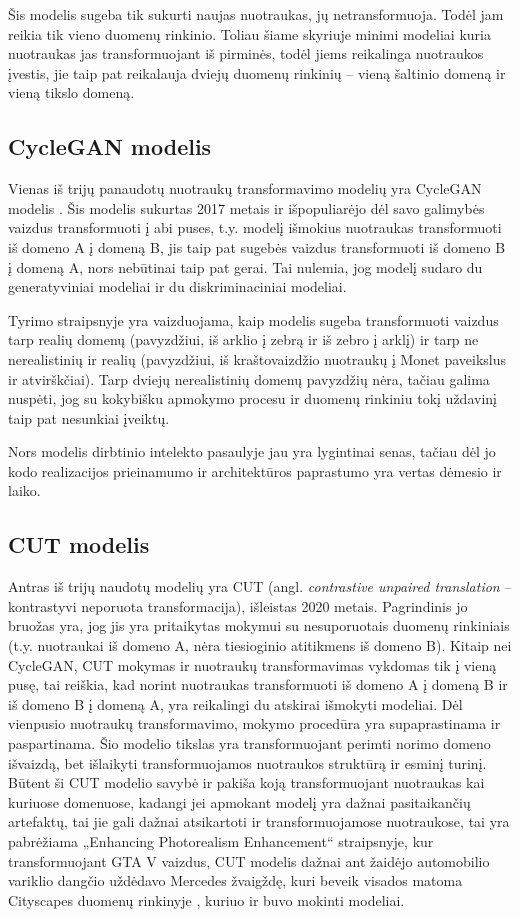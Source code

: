 \documentclass{VUMIFPSkursinis}
\begin{document}
        Šis modelis sugeba tik sukurti naujas nuotraukas, jų netransformuoja. Todėl jam reikia tik vieno duomenų rinkinio. Toliau šiame skyriuje minimi modeliai kuria nuotraukas jas transformuojant iš pirminės, todėl jiems reikalinga nuotraukos įvestis, jie taip pat reikalauja dviejų duomenų rinkinių – vieną šaltinio domeną ir vieną tikslo domeną.
    \subsection{CycleGAN modelis}
        Vienas iš trijų panaudotų nuotraukų transformavimo modelių yra CycleGAN modelis \cite{CycleGAN2017}. Šis modelis sukurtas 2017 metais ir išpopuliarėjo dėl savo galimybės vaizdus transformuoti į abi puses, t.y. modelį išmokius nuotraukas transformuoti iš domeno A į domeną B, jis taip pat sugebės vaizdus transformuoti iš domeno B į domeną A, nors nebūtinai taip pat gerai. Tai nulemia, jog modelį sudaro du generatyviniai modeliai ir du diskriminaciniai modeliai.

        Tyrimo straipsnyje yra vaizduojama, kaip modelis sugeba transformuoti vaizdus tarp realių domenų (pavyzdžiui, iš arklio į zebrą ir iš zebro į arklį) ir tarp ne nerealistinių ir realių (pavyzdžiui, iš kraštovaizdžio nuotraukų į Monet paveikslus ir atvirškčiai). Tarp dviejų nerealistinių domenų pavyzdžių nėra, tačiau galima nuspėti, jog su kokybišku apmokymo procesu ir duomenų rinkiniu tokį uždavinį taip pat nesunkiai įveiktų.

        Nors modelis dirbtinio intelekto pasaulyje jau yra lygintinai  senas, tačiau dėl jo kodo realizacijos prieinamumo ir architektūros paprastumo yra vertas dėmesio ir laiko.
        
    \subsection{CUT modelis}
        Antras iš trijų naudotų modelių yra CUT (angl. \emph{contrastive unpaired translation} – kontrastyvi neporuota transformacija), išleistas 2020 metais. Pagrindinis jo bruožas yra, jog jis yra pritaikytas mokymui su nesuporuotais duomenų rinkiniais (t.y. nuotraukai iš domeno A, nėra tiesioginio atitikmens iš domeno B). Kitaip nei CycleGAN, CUT mokymas ir nuotraukų transformavimas vykdomas tik į vieną pusę, tai reiškia, kad norint nuotraukas transformuoti iš domeno A į domeną B ir iš domeno B į domeną A, yra reikalingi du atskirai išmokyti modeliai. Dėl vienpusio nuotraukų transformavimo, mokymo procedūra yra supaprastinama ir paspartinama. Šio modelio tikslas yra transformuojant perimti norimo domeno išvaizdą, bet išlaikyti transformuojamos nuotraukos struktūrą ir esminį turinį. Būtent ši CUT modelio savybė ir pakiša koją transformuojant nuotraukas kai kuriuose domenuose, kadangi jei apmokant modelį yra dažnai pasitaikančių artefaktų, tai jie gali dažnai atsikartoti ir transformuojamose nuotraukose, tai yra pabrėžiama „Enhancing Photorealism Enhancement“ \cite{EnPhEn} straipsnyje, kur transformuojant GTA V vaizdus, CUT modelis dažnai ant žaidėjo automobilio variklio dangčio uždėdavo Mercedes žvaigždę, kuri beveik visados matoma Cityscapes duomenų rinkinyje \cite{DaimCityDaSe}, kuriuo ir buvo mokinti modeliai.
\end{document}
